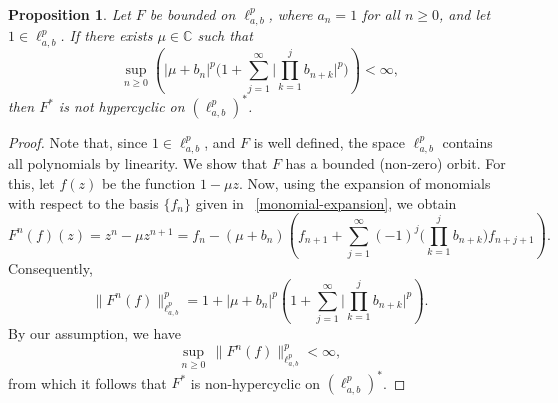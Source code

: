 \documentclass[10pt,a4paper]{amsart}
\newtheorem{proposition}{Proposition}
\begin{document}
\begin{proposition}
Let $F$ be bounded on $\ell^p_{a,b}$, where $a_n=1$ for all $n\geq 0$, and let $1\in \ell^p_{a,b} $. If there exists $\mu \in \mathbb{C}$ such that
\[
\sup_{n\geq 0}\left(|\mu+b_{n}|^{p}\Big(1+\sum_{j=1}^{\infty}
\Big|\prod_{k=1}^{j} b_{n+k}\Big|^{p}\Big)\right)<\infty,
\]
then $F^*$ is not hypercyclic on $(\ell^p_{a,b})^{*}$.
\end{proposition}

\begin{proof}
     Note that, since $1\in \ell^p_{a,b}$, and $F$ is well defined, the space $\ell^p_{a,b}$ contains all polynomials by linearity. We show that $F$ has a bounded (non-zero) orbit. For this, let $f(z)$ be the function $1-\mu z$. Now, using the expansion of monomials with respect to the basis $\{f_n\}$ 
given in ~\eqref{monomial-expansion}, we obtain
\[
F^{n}(f)(z)=z^{n}-\mu z^{n+1}
= f_{n}-(\mu+b_{n})\left( f_{n+1}
+\sum_{j=1}^{\infty}(-1)^j\Big(\prod_{k=1}^{j} b_{n+k}\Big)
f_{n+j+1}\right).
\]
Consequently,
\[
\| F^{n}(f) \|^{p}_{\ell^{p}_{a,b}}
= 1+|\mu+b_{n}|^{p}\left(1 +\sum_{j=1}^{\infty}
\Big|\prod_{k=1}^{j} b_{n+k}\Big|^{p}\right).
\]
By our assumption, we have
\[
\sup_{n\geq 0} \, \| F^{n}(f) \|^{p}_{\ell^{p}_{a,b}} < \infty,
\]
from which it follows that $F^{*}$ is non-hypercyclic on $(\ell^{p}_{a,b})^{*}$.
\end{proof}
\end{document}
